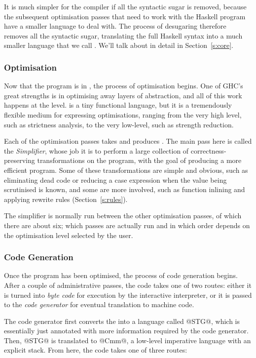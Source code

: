 \documentclass{article}
\begin{document}
It is much simpler for the compiler if all the syntactic sugar is
removed, because the subsequent optimisation passes that need to work
with the Haskell program have a smaller language to deal with.  The
process of desugaring therefore removes all the syntactic sugar,
translating the full Haskell syntax into a much smaller language that
we call \Core{}.  We'll talk about \Core{} in detail in Section~\ref{s:core}.

\subsubsection{Optimisation}

Now that the program is in \Core{}, the process of optimisation
begins.  One of GHC's great strengths is in optimising away layers of
abstraction, and all of this work happens at the \Core{} level.
\Core{} is a tiny functional language, but it is a tremendously
flexible medium for expressing optimisations, ranging from the very
high level, such as strictness analysis, to the very low-level, such
as strength reduction.

Each of the optimisation passes takes \Core{} and produces
\Core{}.  The main pass here is called the \emph{Simplifier}, whose job
it is to perform a large collection of correctness-preserving
transformations on the program, with the goal of producing a more
efficient program.  Some of these transformations are simple and
obvious, such as eliminating dead code or reducing a case expression
when the value being scrutinised is known, and some are more involved,
such as function inlining and applying rewrite rules (Section~\ref{s:rules}).

The simplifier is normally run between the other optimisation passes,
of which there are about six; which passes are actually run and in
which order depends on the optimisation level selected by the user.

\subsubsection{Code Generation}

Once the \Core{} program has been optimised, the process of code
generation begins.  After a couple of administrative passes, the code
takes one of two routes: either it is turned into \emph{byte code} for
execution by the interactive interpreter, or it is passed to the
\emph{code generator} for eventual translation to machine code.

The code generator first converts the \Core{} into a language called
@STG@, which is essentially just \Core{} annotated with more
information required by the code generator.  Then, @STG@ is translated
to @Cmm@, a low-level imperative language with an explicit stack. From
here, the code takes one of three routes:
\end{document}
